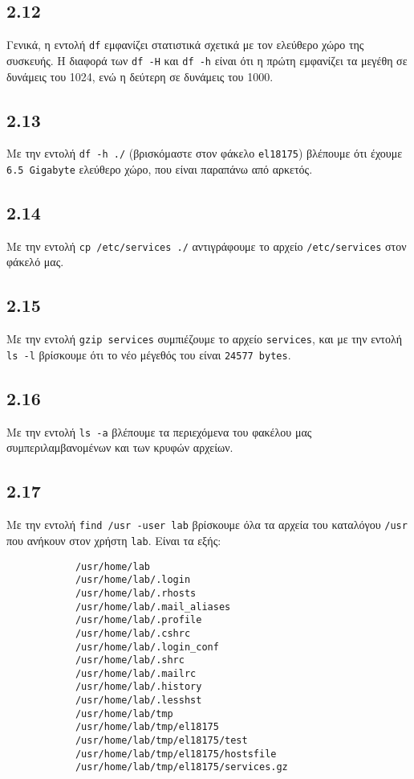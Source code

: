 \documentclass[a4paper, 12pt]{article}
\begin{document}
	\subsection*{2.12}
		Γενικά, η εντολή \verb|df| εμφανίζει στατιστικά σχετικά με τον ελεύθερο χώρο της συσκευής. Η διαφορά των \verb|df -H| και \verb|df -h| είναι ότι η πρώτη εμφανίζει τα μεγέθη σε δυνάμεις του 1024, ενώ η δεύτερη σε δυνάμεις του 1000.

	\subsection*{2.13}
		Με την εντολή \verb|df -h ./| (βρισκόμαστε στον φάκελο \verb|el18175|) βλέπουμε ότι έχουμε \verb|6.5 Gigabyte| ελεύθερο χώρο, που είναι παραπάνω από αρκετός.

	\subsection*{2.14}
		Με την εντολή \verb|cp /etc/services ./| αντιγράφουμε το αρχείο \verb|/etc/services| στον φάκελό μας.

	\subsection*{2.15}
		Με την εντολή \verb|gzip services| συμπιέζουμε το αρχείο \verb|services|, και με την εντολή \verb|ls -l| βρίσκουμε ότι το νέο μέγεθός του είναι \verb|24577 bytes|.

	\subsection*{2.16}
		Με την εντολή \verb|ls -a| βλέπουμε τα περιεχόμενα του φακέλου μας συμπεριλαμβανομένων και των κρυφών αρχείων.

	\subsection*{2.17}
		Με την εντολή \verb|find /usr -user lab| βρίσκουμε όλα τα αρχεία του καταλόγου \verb|/usr| που ανήκουν στον χρήστη \verb|lab|. Είναι τα εξής:
		
		\begin{verbatim}
			/usr/home/lab
			/usr/home/lab/.login
			/usr/home/lab/.rhosts
			/usr/home/lab/.mail_aliases
			/usr/home/lab/.profile
			/usr/home/lab/.cshrc
			/usr/home/lab/.login_conf
			/usr/home/lab/.shrc
			/usr/home/lab/.mailrc
			/usr/home/lab/.history
			/usr/home/lab/.lesshst
			/usr/home/lab/tmp
			/usr/home/lab/tmp/el18175
			/usr/home/lab/tmp/el18175/test
			/usr/home/lab/tmp/el18175/hostsfile
			/usr/home/lab/tmp/el18175/services.gz
		\end{verbatim}
\end{document}
